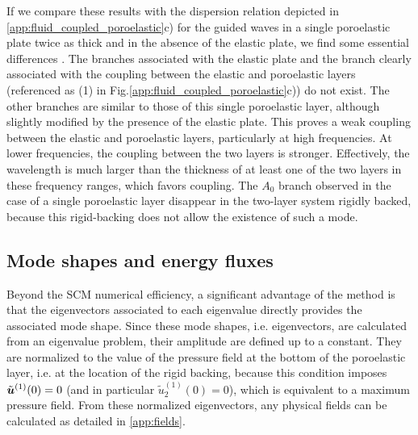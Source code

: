     If we compare these results with the dispersion relation depicted in \ref{app:fluid_coupled_poroelastic}c) for the guided waves in a single poroelastic plate twice as thick and in the absence of the elastic plate, we find some essential differences . The branches associated with the elastic plate and the branch clearly associated with the coupling between the elastic and poroelastic layers (referenced as (1) in Fig.\ref{app:fluid_coupled_poroelastic}c)) do not exist. The other branches are similar to those of this single poroelastic layer, although slightly modified by the presence of the elastic plate. This proves a weak coupling between the elastic and poroelastic layers, particularly at high frequencies. At lower frequencies, the coupling between the two layers is stronger. Effectively, the wavelength is much larger than the thickness of at least one of the two layers in these frequency ranges, which favors coupling. The $A_0$ branch observed in the case of a single poroelastic layer disappear in the two-layer system rigidly backed, because this rigid-backing does not allow the existence of such a mode.
    
    \subsection{Mode shapes and energy fluxes}
    \label{sec:results_shapes}
    Beyond the SCM numerical efficiency, a significant advantage of the method is that the eigenvectors associated to each eigenvalue directly provides the associated mode shape. Since these mode shapes, i.e. eigenvectors, are calculated from an eigenvalue problem, their amplitude are defined up to a constant. They are normalized to the value of the pressure field at the bottom of the poroelastic layer, i.e. at the location of the rigid backing, because this condition imposes $\tilde{\boldsymbol u}^{(1)}(0) = 0$ (and in particular $\tilde{u}_2^{(1)}(0) = 0$), which is equivalent to a maximum pressure field. From these normalized eigenvectors, any physical fields can be calculated as detailed in \ref{app:fields}.   

